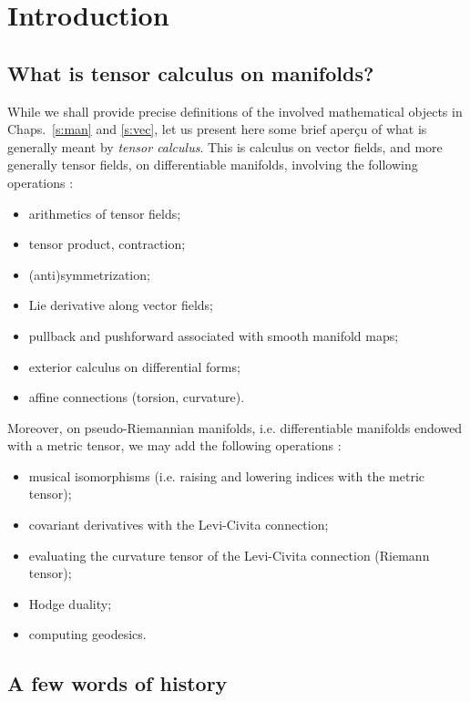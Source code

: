 \chapter{Introduction} \label{s:int}

\minitoc

\section{What is tensor calculus on manifolds?}

While we shall provide precise definitions of the involved mathematical
objects in Chaps.~\ref{s:man} and \ref{s:vec},
let us present here some brief aperçu of what is generally meant by
\emph{tensor calculus}. This is calculus on vector fields,
and more generally tensor fields, on differentiable manifolds, involving the following operations \cite{Lee13}:
\begin{itemize}
\item arithmetics of tensor fields;
\item tensor product, contraction;
\item (anti)symmetrization;
\item Lie derivative along vector fields;
\item pullback and pushforward associated with smooth manifold maps;
\item exterior calculus on differential forms;
\item affine connections (torsion, curvature).
\end{itemize}
Moreover, on pseudo-Riemannian manifolds, i.e. differentiable manifolds endowed
with a metric tensor, we may add the following
operations \cite{Lee97,ONeil83}:
\begin{itemize}
\item musical isomorphisms (i.e. raising and lowering indices with the metric tensor);
\item covariant derivatives with the Levi-Civita connection;
\item evaluating the curvature tensor of the Levi-Civita connection (Riemann tensor);
\item Hodge duality;
\item computing geodesics.
\end{itemize}


\section{A few words of history}

